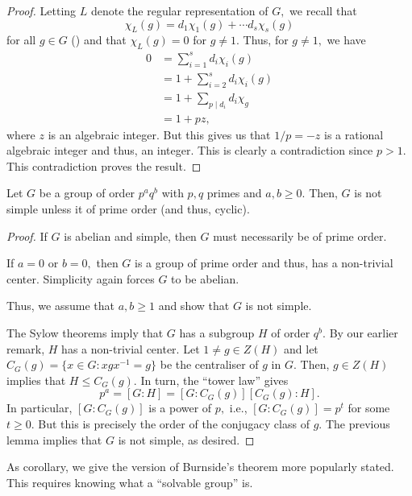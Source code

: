 \begin{proof}
	Letting $L$ denote the regular representation of $G,$ we recall that
	\begin{equation*} 
		\chi_L(g) = d_1\chi_1(g) + \cdots d_s\chi_s(g)
	\end{equation*}
	for all $g \in G$ () and that $\chi_L(g) = 0$ for $g \neq 1.$ Thus, for $g \neq 1,$ we have
	\begin{align*} 
		0 &= \sum_{i = 1}^{s}d_i\chi_i(g)\\
		&= 1 + \sum_{i = 2}^{s}d_i\chi_i(g)\\
		&= 1 + \sum_{p \mid d_i}d_i\chi_g\\
		&= 1 + pz,
	\end{align*}
	where $z$ is an algebraic integer. But this gives us that $1/p = -z$ is a rational algebraic integer and thus, an integer. This is clearly a contradiction since $p > 1.$ This contradiction proves the result.
\end{proof}

\begin{thm}[Burnside] \label{thm:burnsidepq}
	Let $G$ be a group of order $p^aq^b$ with $p, q$ primes and $a, b \ge 0.$ Then, $G$ is not simple unless it of prime order (and thus, cyclic).
\end{thm}
\begin{proof} 
	If $G$ is abelian and simple, then $G$ must necessarily be of prime order. 

	If $a = 0$ or $b = 0,$ then $G$ is a group of prime order and thus, has a non-trivial center. Simplicity again forces $G$ to be abelian. 

	Thus, we assume that $a, b \ge 1$ and show that $G$ is not simple.

	The Sylow theorems imply that $G$ has a subgroup $H$ of order $q^b.$ By our earlier remark, $H$ has a non-trivial center. Let $1 \neq g \in Z(H)$ and let $C_G(g) = \{x \in G : xgx^{-1} = g\}$ be the centraliser of $g$ in $G.$ Then, $g \in Z(H)$ implies that $H \le C_G(g).$ In turn, the ``tower law'' gives
	\begin{equation*} 
		p^a = [G:H] = [G:C_G(g)][C_G(g):H].
	\end{equation*}
	In particular, $[G:C_G(g)]$ is a power of $p,$ i.e., $[G:C_G(g)] = p^t$ for some $t \ge 0.$ But this is precisely the order of the conjugacy class of $g.$ The previous lemma implies that $G$ is not simple, as desired.
\end{proof}

As corollary, we give the version of Burnside's theorem more popularly stated. This requires knowing what a ``solvable group'' is.

